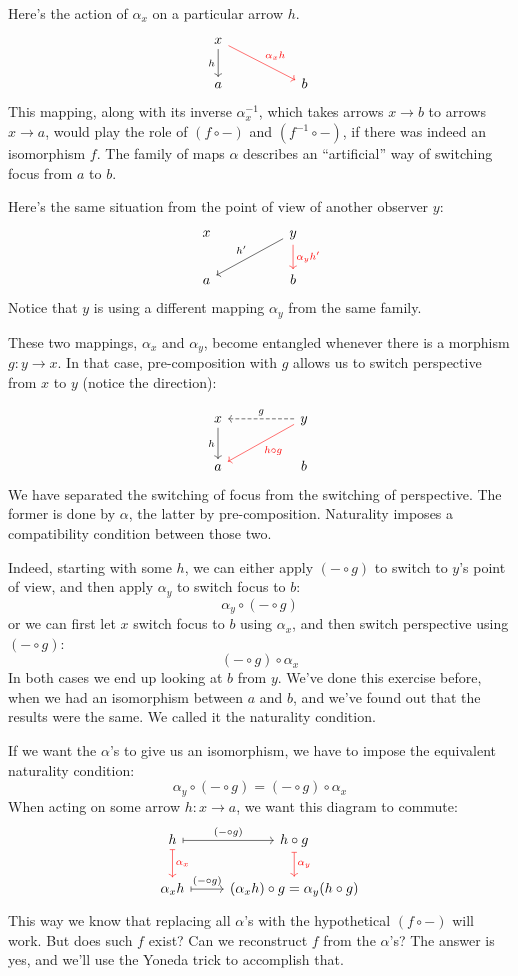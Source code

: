 \documentclass[DaoFP]{subfiles}
\begin{document}
Here's the action of $\alpha_x$ on a particular arrow $h$. 
\[
 \begin{tikzcd}
 x
 \arrow[d, "h"']
 \arrow[rrd, red, "\alpha_x h"]
  \\
 a
  && b
 \end{tikzcd}
\]
This mapping, along with its inverse $\alpha^{-1}_x$, which takes arrows $x \to b$ to arrows $x \to a$, would play the role of $(f \circ -)$ and $(f^{-1} \circ -)$, if there was indeed an isomorphism $f$. The family of maps $\alpha$ describes an ``artificial'' way of switching focus from $a$ to $b$.

Here's the same situation from the point of view of another observer $y$:
\[
 \begin{tikzcd}
 x
  && y
 \arrow[lld, "h'"']
 \arrow[d, red, "\alpha_y h'"]
 \\
 a
  && b
 \end{tikzcd}
\]
Notice that $y$ is using a different mapping $\alpha_y$ from the same family. 

These two mappings, $\alpha_x$ and $\alpha_y$, become entangled whenever there is a morphism $g \colon y \to x$. In that case, pre-composition with $g$ allows us to switch perspective from $x$ to $y$ (notice the direction):

\[
 \begin{tikzcd}
 x
 \arrow[d, "h"']
 && y
 \arrow[ll, dashed, "g"']
 \arrow[lld, red, "h \circ g"]
 \\
 a
  && b
 \end{tikzcd}
\]
We have separated the switching of focus from the switching of perspective. The former is done by $\alpha$, the latter by pre-composition. Naturality imposes a compatibility condition between those two.

Indeed, starting with some $h$, we can either apply $(- \circ g)$ to switch to $y$'s point of view, and then apply $\alpha_y$ to switch focus to $b$:
\[ \alpha_y \circ (- \circ g) \]
or we can first let $x$ switch focus to $b$ using $\alpha_x$, and then switch perspective using $(- \circ g)$:
\[ (- \circ g) \circ \alpha_x \]
In both cases we end up looking at $b$ from $y$. We've done this exercise before, when we had an isomorphism between $a$ and $b$, and we've found out that the results were the same. We called it the naturality condition. 

If we want the $\alpha$'s to give us an isomorphism, we have to impose the equivalent naturality condition:
\[ \alpha_y \circ (- \circ g) = (- \circ g) \circ \alpha_x \]
When acting on some arrow $h \colon x \to a$, we want this diagram to commute:
\[
 \begin{tikzcd}
 h
 \arrow[r, mapsto, "(- \circ g)"]
 \arrow[d, mapsto, red, "\alpha_x"]
 & h \circ g
 \arrow[d, mapsto, red, "\alpha_y"]
 \\
 \alpha_x h
 \arrow[r, mapsto, "(- \circ g)"]
&(\alpha_x h) \circ g = \alpha_y (h \circ g)
 \end{tikzcd}
\]
This way we know that replacing all $\alpha$'s with the hypothetical $(f \circ -)$ will work. But does such $f$ exist? Can we reconstruct $f$ from the $\alpha$'s? The answer is yes, and we'll use the Yoneda trick to accomplish that.
\end{document}
